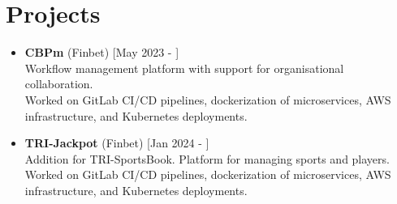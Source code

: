 \documentclass[a4paper]{moderncv}
\begin{document}
\section{Projects}	

		\begin{itemize}
			\item \textbf{CBPm} (Finbet) \hfill[May 2023 - ]\\
			Workflow management platform with support for organisational collaboration. \\
			Worked on GitLab CI/CD pipelines, dockerization of microservices, AWS infrastructure, and Kubernetes deployments.
			
			\item \textbf{TRI-Jackpot} (Finbet) \hfill[Jan 2024 - ]\\
			Addition for TRI-SportsBook. Platform for managing sports and players. \\
			Worked on GitLab CI/CD pipelines, dockerization of microservices, AWS infrastructure, and Kubernetes deployments.
			


\end{itemize}
\end{document}
